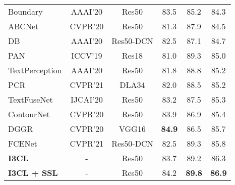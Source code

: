 \begin{table}[ht]
\begin{center}
{\begin{tabular}{l|c|c|ccc}
    Boundary \citep{boundary}           & AAAI'20      & Res50              & 83.5 & 85.2 & 84.3 \\
    ABCNet \citep{abcnet}               & CVPR'20      & Res50              & 81.3 & 87.9 & 84.5 \\
    DB \citep{db}                       & AAAI'20      & Res50-DCN          & 82.5 & 87.1 & 84.7 \\
    PAN \citep{pan}                     & ICCV'19      & Res18              & 81.0 & 89.3 & 85.0 \\
    TextPerception \citep{textperceptron} & AAAI'20    & Res50              & 81.8 & 88.8 & 85.2  \\
    PCR \citep{pcr}                     & CVPR'21      & DLA34              & 82.0 & 88.5 & 85.2  \\
    TextFuseNet \citep{textfusenet}     & IJCAI'20     & Res50              & 83.2 & 87.5 & 85.3 \\
    ContourNet \citep{contournet}       & CVPR'20      & Res50              & 83.9 & 86.9 & 85.4 \\
    DGGR \citep{dggrn}                  & CVPR'20      & VGG16              & \textbf{84.9} & 86.5 & 85.7\\
    FCENet \citep{fcenet}               & CVPR'21      & Res50-DCN          & 82.5 & 89.3 & 85.8 \\
    \hline
    \textbf{I3CL}                      & -              & Res50              & 83.7 & 89.2 & 86.3\\
    \textbf{I3CL + SSL}                & -              & Res50              & 84.2 & \textbf{89.8} & \textbf{86.9}\\
\hline\hline
\end{tabular}}
\vspace{-3mm}
\end{center}
\end{table}



